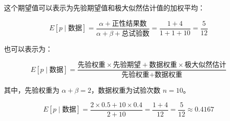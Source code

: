 \documentclass[stu,12pt,floatsintext]{apa7} %
\begin{document}
这个期望值可以表示为先验期望值和极大似然估计值的加权平均：

\[
E[p \mid \text{数据}] = \frac{\alpha + \text{正性结果数}}{\alpha + \beta + \text{总试验数}} = \frac{1 + 4}{1 + 1 + 10} = \frac{5}{12}
\]

也可以表示为：

\[
E[p \mid \text{数据}] = \frac{\text{先验权重} \times \text{先验期望} + \text{数据权重} \times \text{极大似然估计}}{\text{先验权重} + \text{数据权重}}
\]

其中，先验权重为 \(\alpha + \beta = 2\)，数据权重为试验次数 \(n = 10\)。

\[
E[p \mid \text{数据}] = \frac{2 \times 0.5 + 10 \times 0.4}{2 + 10} = \frac{1 + 4}{12} = \frac{5}{12} \approx 0.4167
\]
\end{document}
